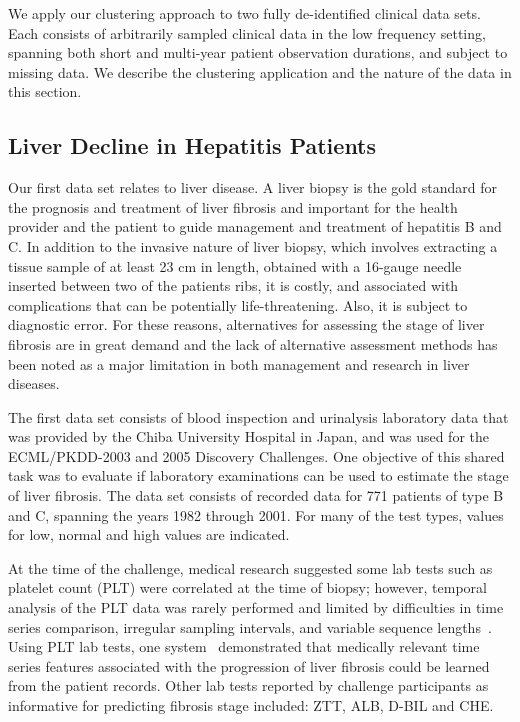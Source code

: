 We apply our clustering approach to two fully de-identiﬁed clinical data sets.  Each consists of arbitrarily sampled clinical data in the low frequency setting, spanning both short and multi-year patient observation durations, and subject to missing data.  We describe the clustering application and the nature of the data in this section.

\subsection{Liver Decline in Hepatitis Patients}
Our first data set relates to liver disease.  A liver biopsy is the gold standard for the prognosis and treatment of liver fibrosis and important for the health provider and the patient to guide management and treatment of hepatitis B and C. In addition to the invasive nature of liver biopsy, which involves extracting a tissue sample of at least 23 cm in length, obtained with a 16-gauge needle inserted between two of the patients ribs, it is costly, and associated with complications that can be potentially life-threatening.  Also, it is subject to diagnostic error. For these reasons, alternatives for assessing the stage of liver fibrosis are in great demand and the lack of alternative assessment methods has been noted as a major limitation in both management and research in liver diseases.

The first data set consists of blood inspection and urinalysis laboratory data that was provided by the Chiba University Hospital in Japan, and was used for the ECML/PKDD-2003 and 2005 Discovery Challenges.  One objective of this shared task was to evaluate if laboratory examinations can be used to estimate the stage of liver fibrosis. The data set consists of recorded data for 771 patients of type B and C, spanning the years 1982 through 2001.  For many of the test types, values for low, normal and high values are indicated.

At the time of the challenge, medical research suggested some lab tests such as platelet count (PLT) were correlated at the time of biopsy; however, temporal analysis of the PLT data was rarely performed and limited by difficulties in time series comparison, irregular sampling intervals, and variable sequence lengths~\cite{Hirano05}.  Using PLT lab tests, one system~\cite{Hirano07} demonstrated that medically relevant time series features associated with the progression of liver fibrosis could be learned from the patient records.  Other lab tests reported by challenge participants as informative for predicting fibrosis stage included: ZTT, ALB, D-BIL and CHE.

